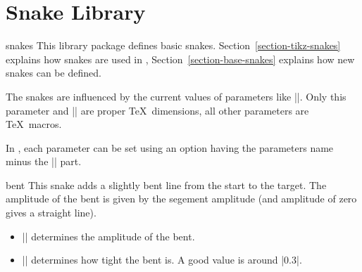 %


\section{Snake Library}

\label{section-library-snakes}

\begin{pgflibrary}{snakes}
  This library package defines basic
  snakes. Section~\ref{section-tikz-snakes} explains how snakes are
  used in \tikzname, Section~\ref{section-base-snakes} explains how
  new snakes can be defined.

  The snakes are influenced by the current values of parameters like
  |\pgfsnakesegmentamplitude|. Only this parameter and
  |\pgfsnakesegmentlength| are proper \TeX\ dimensions, all other
  parameters are \TeX\ macros.

  In \tikzname, each parameter can be set using an option having the
  parameters name minus the |\pgfsnake| part.
\end{pgflibrary}


\begin{snake}{bent}
  This snake adds a slightly bent line from the start to the
  target. The amplitude of the bent is given by the segement amplitude
  (and amplitude of zero gives a straight line). 
  \begin{itemize}
  \item |\pgfsnakesegmentamplitude|
    determines the amplitude of the bent.
  \item |\pgfsnakesegmentaspect|
    determines how tight the bent is. A good value is around |0.3|. 
  \end{itemize}
\begin{codeexample}[]
\end{codeexample}
\end{snake}



